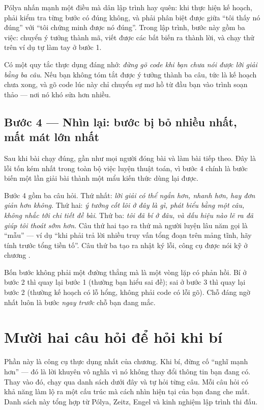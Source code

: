 \documentclass[../../algorithm.tex]{subfiles}
\begin{document}
Pólya nhấn mạnh một điều mà dân lập trình hay quên: khi thực hiện kế hoạch, phải kiểm tra từng bước có đúng không, và phải phân biệt được giữa ``tôi thấy nó đúng'' với ``tôi chứng minh được nó đúng''. Trong lập trình, bước này gồm ba việc: chuyển ý tưởng thành mã, viết được các bất biến ra thành lời, và chạy thử trên ví dụ tự làm tay ở bước 1.

Có một quy tắc thực dụng đáng nhớ: \emph{đừng gõ code khi bạn chưa nói được lời giải bằng ba câu}. Nếu bạn không tóm tắt được ý tưởng thành ba câu, tức là kế hoạch chưa xong, và gõ code lúc này chỉ chuyển sự mơ hồ từ đầu bạn vào trình soạn thảo --- nơi nó khó sửa hơn nhiều.

\subsection{Bước 4 --- Nhìn lại: bước bị bỏ nhiều nhất, mất mát lớn nhất}

Sau khi bài chạy đúng, gần như mọi người đóng bài và làm bài tiếp theo. Đây là lỗi tốn kém nhất trong toàn bộ việc luyện thuật toán, vì bước 4 chính là bước biến một lần giải bài thành một mẩu kiến thức dùng lại được.

Bước 4 gồm ba câu hỏi. Thứ nhất: \emph{lời giải có thể ngắn hơn, nhanh hơn, hay đơn giản hơn không}. Thứ hai: \emph{ý tưởng cốt lõi ở đây là gì, phát biểu bằng một câu, không nhắc tới chi tiết đề bài}. Thứ ba: \emph{tôi đã bí ở đâu, và dấu hiệu nào lẽ ra đã giúp tôi thoát sớm hơn}. Câu thứ hai tạo ra thứ mà người luyện lâu năm gọi là ``mẫu'' --- ví dụ ``khi phải trả lời nhiều truy vấn tổng đoạn trên mảng tĩnh, hãy tính trước tổng tiền tố''. Câu thứ ba tạo ra nhật ký lỗi, công cụ được nói kỹ ở chương .

\begin{cannho}
Bốn bước không phải một đường thẳng mà là một vòng lặp có phản hồi. Bí ở bước 2 thì quay lại bước 1 (thường bạn hiểu sai đề); sai ở bước 3 thì quay lại bước 2 (thường kế hoạch có lỗ hổng, không phải code có lỗi gõ). Chỗ đáng ngờ nhất luôn là bước \emph{ngay trước} chỗ bạn đang mắc.
\end{cannho}

\section{Mười hai câu hỏi để hỏi khi bí}

Phần này là công cụ thực dụng nhất của chương. Khi bí, đừng cố ``nghĩ mạnh hơn'' --- đó là lời khuyên vô nghĩa vì nó không thay đổi thông tin bạn đang có. Thay vào đó, chạy qua danh sách dưới đây và tự hỏi từng câu. Mỗi câu hỏi có khả năng làm lộ ra một cấu trúc mà cách nhìn hiện tại của bạn đang che mất. Danh sách này tổng hợp từ Pólya\cite{polya1945}, Zeitz\cite{zeitz2007}, Engel\cite{engel1998} và kinh nghiệm lập trình thi đấu.
\end{document}
